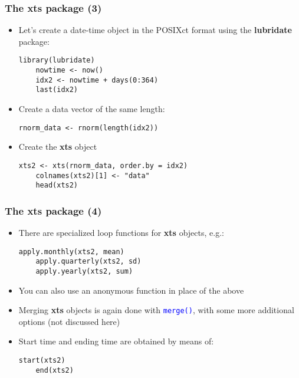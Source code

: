 \documentclass[10pt]{beamer}
\newcommand{\cc}[1]{\texttt{\textcolor{blue}{#1}}}
\theoremstyle{definition}
\begin{document}
\begin{frame}[fragile]
\frametitle{The \textbf{xts} package (3)}
\begin{itemize}
	\item Let's create a date-time object in the POSIXct format using the \textbf{lubridate} package:
	\begin{lstlisting}[style = rstyle, breaklines]
	library(lubridate)
	nowtime <- now()
	idx2 <- nowtime + days(0:364)
	last(idx2)		
	\end{lstlisting}
	\item Create a data vector of the same length:
	\begin{lstlisting}[style = rstyle, breaklines]
	rnorm_data <- rnorm(length(idx2))
	\end{lstlisting}
	\item Create the \textbf{xts} object
	\begin{lstlisting}[style = rstyle, breaklines]
	xts2 <- xts(rnorm_data, order.by = idx2)
	colnames(xts2)[1] <- "data"
	head(xts2)
	\end{lstlisting}
\end{itemize}
\end{frame}

\begin{frame}[fragile]
\frametitle{The \textbf{xts} package (4)}
\begin{itemize}
	\item There are specialized loop functions for \textbf{xts} objects, e.g.:
	\begin{lstlisting}[style = rstyle, breaklines]
	apply.monthly(xts2, mean)
	apply.quarterly(xts2, sd)
	apply.yearly(xts2, sum)
	\end{lstlisting}
	\item You can also use an anonymous function in place of the above
	\item Merging \textbf{xts} objects is again done with \cc{merge()}, with some more additional options (not discussed here)
	\item Start time and ending time are obtained by means of:
	\begin{lstlisting}[style = rstyle, breaklines]
	start(xts2)
	end(xts2)
	\end{lstlisting}
\end{itemize}
\end{frame}
\end{document}
